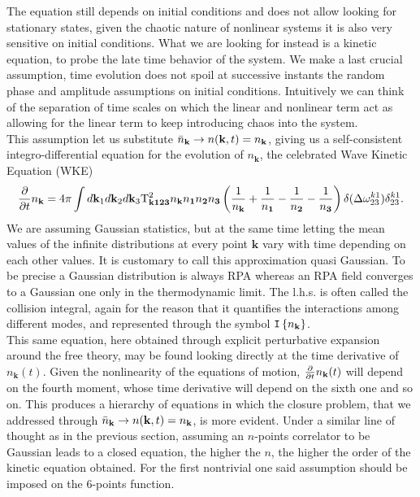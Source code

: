 The equation still depends on initial conditions and does not allow looking for stationary states, given the chaotic nature of nonlinear systems it is also very 
sensitive on initial conditions. What we are looking for instead is a kinetic equation, to probe the late time behavior of the system.
We make a last crucial assumption, time evolution does not spoil at successive instants the random phase and amplitude 
assumptions on initial conditions. Intuitively we can think of the separation of time scales on which the linear and nonlinear term act as allowing for 
the linear term to keep introducing chaos into the system. \\
This assumption let us substitute $\bar{n}_\mathbf{k} \rightarrow n(\mathbf{k},t) = n_\mathbf{k}$, giving us a self-consistent 
integro-differential equation for the evolution of $n_\mathbf{k}$, the celebrated
Wave Kinetic Equation (WKE)
\begin{equation}
    \frac{\partial}{\partial t} n_\mathbf{k} = 4 \pi\int d\mathbf{k}_1 d\mathbf{k}_2 d\mathbf{k}_3 \\
    \mathrm{T}^2_\mathbf{k123}n_\mathbf{k}n_\mathbf{1}n_\mathbf{2}n_\mathbf{3}
    \left(\frac{1}{n_\mathbf{k}} + \frac{1}{n_\mathbf{1}} - \frac{1}{n_\mathbf{2}}- \frac{1}{n_\mathbf{3}}  \right)
    \delta(\Delta{\omega}^{k1}_{23})\delta^{k1}_{23}.
    \label{kinetic}
\end{equation}
We are assuming Gaussian statistics, but at the same time letting the mean values of the infinite distributions at every point $\mathbf{k}$ 
vary with time depending on each other values. It is customary to call this approximation quasi Gaussian. To be precise a Gaussian distribution is always
RPA whereas an RPA field converges to a Gaussian one only in the thermodynamic limit. The l.h.s. is often called the collision integral, again 
for the reason that it quantifies the interactions among different modes, and represented through the symbol $\mathtt{I}\left\{n_\mathbf{k}\right\}$. \\
This same equation, here obtained through explicit perturbative expansion around the free theory, may be found looking directly at the time 
derivative of $n_\mathbf{k}(t)$. 
Given the nonlinearity of the equations of motion, $\frac{\partial}{\partial t} n_\mathbf{k}(t)$ will depend on the fourth moment, whose time derivative will depend on the sixth one and so on. 
This produces a hierarchy of equations in which the closure problem, that we addressed through $\bar{n}_\mathbf{k} \rightarrow n(\mathbf{k},t) = n_\mathbf{k}$, 
is more evident. Under a similar line of thought
as in the previous section, assuming an $n$-points correlator to be Gaussian leads to a closed equation, the higher the $n$, the higher 
the order of the kinetic equation obtained.
For the first nontrivial one said assumption should be imposed on the 6-points function.\\

